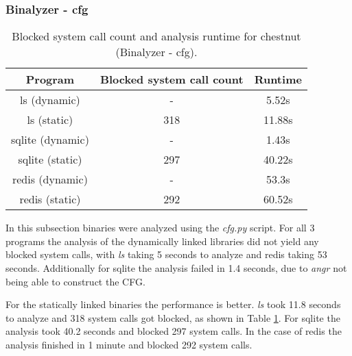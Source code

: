 \subsubsection {Binalyzer - cfg}
\begin{table}[!h]
\begin{center}
\caption{Blocked system call count and analysis runtime for chestnut (Binalyzer - cfg).}
\label{tbl:chestnut_bin_cfg_results}
\begin{tabular}{||c c c||} 
 \hline
 Program & Blocked system call count & Runtime \\
 \hline\hline
 ls (dynamic) & - & 5.52s \\ 
 \hline
 ls (static) & 318 & 11.88s \\ 
 \hline
 sqlite (dynamic) & - & 1.43s \\ 
 \hline
 sqlite (static) & 297 & 40.22s \\ 
 \hline
 redis (dynamic) & - & 53.3s \\ 
 \hline
 redis (static) & 292 & 60.52s \\ 
 \hline
\end{tabular}
\end{center}
\end{table}
In this subsection binaries were analyzed using the \textit{cfg.py} script.
For all 3 programs the analysis of the dynamically linked libraries did not yield any blocked system calls, with \textit{ls} taking 5 seconds to analyze and redis taking 53 seconds. Additionally for sqlite the analysis failed in 1.4 seconds, due to \textit{angr} not being able to construct the CFG.

For the statically linked binaries the performance is better.
\textit{ls} took 11.8 seconds to analyze and 318 system calls got blocked, as shown in Table \ref{tbl:chestnut_bin_cfg_results}.
For sqlite the analysis took 40.2 seconds and blocked 297 system calls.
In the case of redis the analysis finished in 1 minute and blocked 292 system calls.

